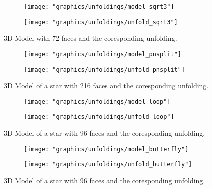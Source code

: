 \documentclass[draft,final]{vutinfth} %
\begin{document}
\begin{figure}
  \begin{subfigure}[b]{0.5\textwidth}
    \texttt{[image: "graphics/unfoldings/model\_sqrt3"]}
  \end{subfigure}
  \begin{subfigure}[b]{0.5\textwidth}
    \texttt{[image: "graphics/unfoldings/unfold\_sqrt3"]}
  \end{subfigure}
  
  \caption{3D Model with 72 faces and the coresponding unfolding.}
  \label{fig:sqrt3}
\end{figure}

\begin{figure}
  \begin{subfigure}[b]{0.5\textwidth}
    \texttt{[image: "graphics/unfoldings/model\_pnsplit"]}
  \end{subfigure}
  \begin{subfigure}[b]{0.5\textwidth}
    \texttt{[image: "graphics/unfoldings/unfold\_pnsplit"]}
  \end{subfigure}
  
  \caption{3D Model of a star with 216 faces and the coresponding unfolding.}
  \label{fig:pnsplit}
\end{figure}

\begin{figure}
  \begin{subfigure}[b]{0.5\textwidth}
    \texttt{[image: "graphics/unfoldings/model\_loop"]}
  \end{subfigure}
  \begin{subfigure}[b]{0.5\textwidth}
    \texttt{[image: "graphics/unfoldings/unfold\_loop"]}
  \end{subfigure}
  
  \caption{3D Model of a star with 96 faces and the coresponding unfolding.}
  \label{fig:loop}
\end{figure}

\begin{figure}
  \begin{subfigure}[b]{0.5\textwidth}
    \texttt{[image: "graphics/unfoldings/model\_butterfly"]}
  \end{subfigure}
  \begin{subfigure}[b]{0.5\textwidth}
    \texttt{[image: "graphics/unfoldings/unfold\_butterfly"]}
  \end{subfigure}
  
  \caption{3D Model of a star with 96 faces and the coresponding unfolding.}
  \label{fig:butterfly}
\end{figure}
\end{document}
